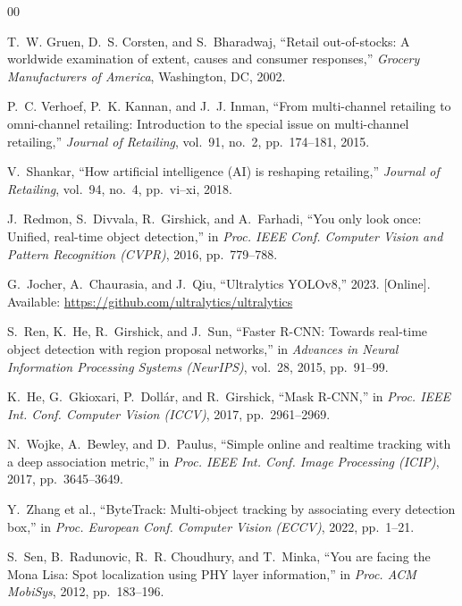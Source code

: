 \documentclass[conference]{IEEEtran}
\begin{document}
\begin{thebibliography}{00}

T.~W. Gruen, D.~S. Corsten, and S.~Bharadwaj, ``Retail out-of-stocks: A worldwide examination of extent, causes and consumer responses,'' \textit{Grocery Manufacturers of America}, Washington, DC, 2002.

P.~C. Verhoef, P.~K. Kannan, and J.~J. Inman, ``From multi-channel retailing to omni-channel retailing: Introduction to the special issue on multi-channel retailing,'' \textit{Journal of Retailing}, vol.~91, no.~2, pp.~174--181, 2015.

V.~Shankar, ``How artificial intelligence (AI) is reshaping retailing,'' \textit{Journal of Retailing}, vol.~94, no.~4, pp.~vi--xi, 2018.

J.~Redmon, S.~Divvala, R.~Girshick, and A.~Farhadi, ``You only look once: Unified, real-time object detection,'' in \textit{Proc. IEEE Conf. Computer Vision and Pattern Recognition (CVPR)}, 2016, pp.~779--788.

G.~Jocher, A.~Chaurasia, and J.~Qiu, ``Ultralytics YOLOv8,'' 2023. [Online]. Available: \url{https://github.com/ultralytics/ultralytics}

S.~Ren, K.~He, R.~Girshick, and J.~Sun, ``Faster R-CNN: Towards real-time object detection with region proposal networks,'' in \textit{Advances in Neural Information Processing Systems (NeurIPS)}, vol.~28, 2015, pp.~91--99.

K.~He, G.~Gkioxari, P.~Doll\'{a}r, and R.~Girshick, ``Mask R-CNN,'' in \textit{Proc. IEEE Int. Conf. Computer Vision (ICCV)}, 2017, pp.~2961--2969.

N.~Wojke, A.~Bewley, and D.~Paulus, ``Simple online and realtime tracking with a deep association metric,'' in \textit{Proc. IEEE Int. Conf. Image Processing (ICIP)}, 2017, pp.~3645--3649.

Y.~Zhang et al., ``ByteTrack: Multi-object tracking by associating every detection box,'' in \textit{Proc. European Conf. Computer Vision (ECCV)}, 2022, pp.~1--21.

S.~Sen, B.~Radunovic, R.~R. Choudhury, and T.~Minka, ``You are facing the Mona Lisa: Spot localization using PHY layer information,'' in \textit{Proc. ACM MobiSys}, 2012, pp.~183--196.


\end{thebibliography}
\end{document}
